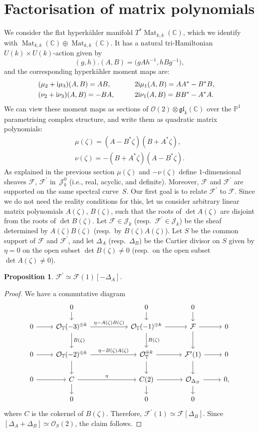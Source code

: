 \documentclass[pdftex]{sigma}
\newcommand{\gl}{{\mathfrak g \mathfrak l}}
\newcommand{\cx}{{\mathbb C}}
\newcommand{\Mat}{\operatorname{Mat}}
\numberwithin{equation}{section}
\newtheorem{Proposition}[Theorem]{Proposition}
 { \theoremstyle{definition}
\newtheorem{Definition}[Theorem]{Definition}
\newtheorem{Note}[Theorem]{Note}
\newtheorem{Example}[Theorem]{Example}
\newtheorem{Remark}[Theorem]{Remark} }
\newcommand{\oP}{{\mathbb{P}}}
\newcommand{\oT}{{\mathbb{T}}}
\newcommand{\sF}{{\mathcal{F}}}
\newcommand{\sO}{{\mathcal{O}}}
\begin{document}
\section{Factorisation of matrix polynomials}
We consider the flat hyperk\"ahler manifold $T^\ast \Mat_{k,k}(\cx)$, which we identify with $\Mat_{k,k}(\cx)\oplus \Mat_{k,k}(\cx)$.
It has a natural tri-Hamiltonian $U(k)\times U(k)$-action given by
\[
(g,h).(A,B)=\big(gAh^{-1},hBg^{-1}\big),
\]
and the corresponding hyperk\"ahler moment maps are:
\begin{alignat*}{3}
& (\mu_2+{\rm i}\mu_3)(A,B)=AB,\qquad&& 2{\rm i}\mu_1(A,B)=AA^\ast-B^\ast B,&
\\
&(\nu_2+{\rm i}\nu_3)(A,B)=-BA,\qquad && 2{\rm i}\nu_1(A,B)=BB^\ast-A^\ast A.&
\end{alignat*}
We can view these moment maps as sections of $\sO(2)\otimes \gl_k(\cx)$ over the $\oP^1$ parametrising complex structure, and write them as quadratic matrix polynomials:
\begin{gather}\mu(\zeta)=(A-B^\ast\zeta)(B+A^\ast\zeta),\label{mu}
\\
 \nu(\zeta)=-(B+A^\ast\zeta)(A-B^\ast\zeta).\label{nu}
 \end{gather}
As explained in the previous section $\mu(\zeta)$ and $-\nu(\zeta)$ define $1$-dimensional sheaves $\sF$, $\sF^\prime$ in~$\mathscr{J}_k^0$
(i.e., real, acyclic, and definite). Moreover, $\sF$ and $\sF^\prime$ are supported on the same spectral curve~$S$. Our first goal is to relate $\sF^\prime$ to $\sF$. Since we do not need the reality conditions for this, let us consider arbitrary linear matrix polynomials $A(\zeta)$, $B(\zeta)$, such that the roots of $\det A(\zeta)$ are disjoint from the roots of $\det B(\zeta)$. Let $\sF\in \mathscr{J}_k$ (resp.~$\sF^\prime\in \mathscr{J}_k$) be the sheaf determined by $A(\zeta)B(\zeta)$ (resp.~by $B(\zeta)A(\zeta)$). Let $S$ be the common support of $\sF$ and $\sF^\prime$, and let $\Delta_A$ (resp.~$\Delta_B$) be the Cartier divisor on $S$ given by $\eta=0$ on the open subset $\det B(\zeta)\neq 0$ (resp.~on the open subset $\det A(\zeta)\neq 0$).
\begin{Proposition} $\sF^\prime\simeq \sF(1)[-\Delta_A]$.
\label{sF'}\end{Proposition}
\begin{proof} We have a commutative diagram
\[
\begin{tikzcd} & 0 \ar[d] &[30pt] 0 \ar[d]& 0\ar[d] &\\[-6pt] 0 \ar[r] & \sO_{\oT}(-3)^{\oplus k}\ar[r, "\eta-A(\zeta)B(\zeta)"] \ar[d, "B(\zeta)"] &\sO_\oT(-1)^{\oplus k} \ar[d, "B(\zeta)"] \ar[r]& \sF\ar[r]\ar[d] & 0\\[3pt]
0 \ar[r] &\sO_\oT(-2)^{\oplus k}\ar[r, "\eta-B(\zeta)A(\zeta)"]\ar[d]& \sO_\oT^{\oplus k}\ar[r] \ar[d] &\sF^\prime(1)\ar[r]\ar[d] & 0\\ 0\ar[r] &C \ar[d]\ar[r, "\eta"]& C(2) \ar[d]\ar[r] & \sO_{\Delta_B}\ar[d]\ar[r] & 0,\\[-6pt] & 0 & 0 & 0 &
\end{tikzcd}
\]
where $C$ is the cokernel of $B(\zeta)$.
Therefore, $\sF^\prime(1)\simeq \sF[\Delta_B]$. Since $[\Delta_A+\Delta_B]\simeq \sO_S(2)$, the claim follows.
\end{proof}
\end{document}
